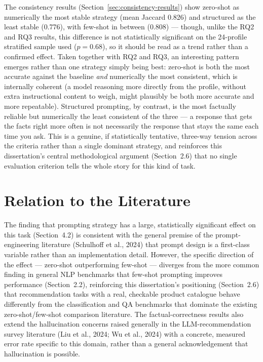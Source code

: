 The consistency results (Section~\ref{sec:consistency-results}) show zero-shot as numerically the most stable strategy (mean Jaccard 0.826) and structured as the least stable (0.776), with few-shot in between (0.808) --- though, unlike the RQ2 and RQ3 results, this difference is not statistically significant on the 24-profile stratified sample used ($p = 0.68$), so it should be read as a trend rather than a confirmed effect. Taken together with RQ2 and RQ3, an interesting pattern emerges rather than one strategy simply being best: zero-shot is both the most accurate against the baseline \textit{and} numerically the most consistent, which is internally coherent (a model reasoning more directly from the profile, without extra instructional content to weigh, might plausibly be both more accurate and more repeatable). Structured prompting, by contrast, is the most factually reliable but numerically the least consistent of the three --- a response that gets the facts right more often is not necessarily the response that stays the same each time you ask. This is a genuine, if statistically tentative, three-way tension across the criteria rather than a single dominant strategy, and reinforces this dissertation's central methodological argument (Section~2.6) that no single evaluation criterion tells the whole story for this kind of task.

\section{Relation to the Literature}

The finding that prompting strategy has a large, statistically significant effect on this task (Section~4.2) is consistent with the general premise of the prompt-engineering literature (Schulhoff et al., 2024) that prompt design is a first-class variable rather than an implementation detail. However, the specific direction of the effect --- zero-shot outperforming few-shot --- diverges from the more common finding in general NLP benchmarks that few-shot prompting improves performance (Section~2.2), reinforcing this dissertation's positioning (Section~2.6) that recommendation tasks with a real, checkable product catalogue behave differently from the classification and QA benchmarks that dominate the existing zero-shot/few-shot comparison literature. The factual-correctness results also extend the hallucination concerns raised generally in the LLM-recommendation survey literature (Liu et al., 2024; Wu et al., 2024) with a concrete, measured error rate specific to this domain, rather than a general acknowledgement that hallucination is possible.

